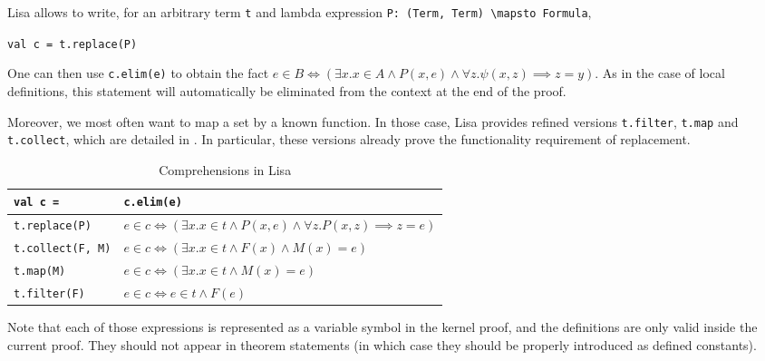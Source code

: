       Lisa allows to write, for an arbitrary term \lstinline|t| and lambda expression \lstinline|P: (Term, Term) \mapsto Formula|,
      \begin{center}
        \lstinline|val c = t.replace(P)|
      \end{center}
      One can then use \lstinline|c.elim(e)| to obtain the fact
      $e \in B \iff (\exists x. x \in A \land P(x, e) \land \forall z. \psi(x, z) \implies z = y)$. As in the case of local definitions, this statement will automatically be eliminated from the context at the end of the proof.

      Moreover, we most often want to map a set by a known function. In those case, Lisa provides refined versions \lstinline|t.filter|, \lstinline|t.map| and \lstinline|t.collect|, which are detailed in . In particular, these versions already prove the functionality requirement of replacement.
      \begin{table}[h]
        \begin{tabular}{l|l}
          \textbf{\lstinline|val c = |} & \textbf{\lstinline|c.elim(e)|} \\ \hline
          \lstinline|t.replace(P)| & $e \in c \iff (\exists x. x \in t \land P(x, e) \land ∀ z. P(x, z) \implies z = e)$ \\
          \lstinline|t.collect(F, M)| & $e \in c \iff (\exists x. x \in t \land F(x) \land M(x) = e)$ \\
          \lstinline|t.map(M)| & $e \in c \iff (\exists x. x \in t \land M(x) = e)$ \\
          \lstinline|t.filter(F)| & $e \in c \iff e \in t \land F(e)$ \\
        \end{tabular}
        \caption{Comprehensions in Lisa}
        \label{tab:comprehensions}
      \end{table}

      Note that each of those expressions is represented as a variable symbol in the kernel proof, and the definitions are only valid inside the current proof. They should not appear in theorem statements (in which case they should be properly introduced as defined constants).